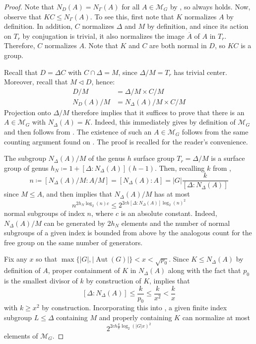 \documentclass[11pt]{article}
\theoremstyle{plain}
\theoremstyle{definition}
\theoremstyle{remark}
\newcommand{\calM}{\mathcal{M}}
\newcommand{\Gam}{\Gamma}
\newcommand{\Del}{\Delta}
\DeclareMathOperator{\Aut}{Aut}
\newcommand{\conj}{\overline}
\newenvironment{pf}{\begin{proof}}{\end{proof}}
\begin{document}
\begin{pf}
Note that $N_D(A) = N_\Gam(A)$ for all $A \in \calM_G$ by , so  always holds. Now, observe that $KC \le N_\Gam(A)$. To see this, first note that $K$ normalizes $A$ by definition. In addition, $C$ normalizes $\Del$ and $M$ by definition, and since its action on $T_r$ by conjugation is trivial, it also normalizes the image $\conj{A}$ of $A$ in $T_r$. Therefore, $C$ normalizes $A$. Note that $K$ and $C$ are both normal in $D$, so $KC$ is a group.

Recall that $D = \Del C$ with $C \cap \Del = M$, since $\Del / M = T_r$ has trivial center. Moreover, recall that $M \triangleleft D$, hence:
\begin{align}
D / M &= \Del / M \times C / M \label{eq:D/M} \\
N_D(A) / M &= N_\Del(A) / M \times C / M \label{eq:ND(A)/M}
\end{align}
Projection onto $\Del / M$ therefore implies that it suffices to prove that there is an $A \in \calM_G$ with $N_\Del(A) = K$. Indeed, this immediately gives  by definition of $\calM_G$ and  then follows from . The existence of such an $A \in \calM_G$ follows from the same counting argument found on \cite[p.\ 466-467]{BelolipetskyLubotzky}. The proof is recalled for the reader's convenience.

The subgroup $N_\Del(A)/M$ of the genus $h$ surface group $T_r = \Del / M$ is a surface group of genus $h_N \coloneqq 1 + [\Del : N_\Del(A)](h-1)$. Then, recalling $k$ from ,
\begin{equation}\label{eq:AIndex}
n \coloneqq [N_\Del(A) / M : A / M] = [N_\Del(A) : A] = |G| \frac{k}{[\Del : N_\Del(A)]}
\end{equation}
since $M \le A$, and \cite[Thm.\ 2.7]{LubotzkySegal} then implies that $N_\Del(A) / M$ has at most
\begin{equation}\label{eq:NormalBound1}
n^{2 h_N \! \log_2(n) c} \le 2^{2 c h [\Del : N_\Del(A)]\! \log_2(n)^2}
\end{equation}
normal subgroups of index $n$, where $c$ is an absolute constant. Indeed, $N_\Del(A)/M$ can be generated by $2 h_N$ elements and the number of normal subgroups of a given index is bounded from above by the analogous count for the free group on the same number of generators.

Fix any $x$ so that $\max\{|G|, |\Aut(G)|\} < x < \sqrt{p_0}$. Since $K \le N_\Del(A)$ by definition of $A$, proper containment of $K$ in $N_\Del(A)$ along with the fact that $p_0$ is the smallest divisor of $k$ by construction of $K$, implies that
\begin{equation}\label{eq:IndexBound}
[\Del : N_\Del(A)] \le \frac{k}{p_0} \le \frac{k}{x^2} < \frac{k}{x}
\end{equation}
with $k \ge x^2$ by construction. Incorporating this into , a given finite index subgroup $L \le \Del$ containing $M$ and properly containing $K$ can normalize at most
\begin{equation}\label{eq:NormalBound2}
2^{2 c h \frac{k}{x}\! \log_2(|G| x)^2}
\end{equation}
elements of $\calM_G$.


\end{pf}
\end{document}

